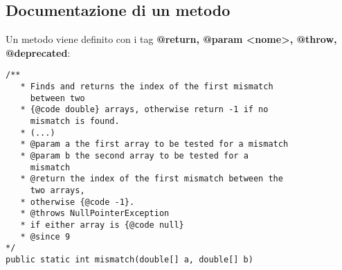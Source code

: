 \documentclass{article}
\begin{document}
\subsection{Documentazione di un metodo}
Un metodo viene definito con i tag \textbf{@return, @param <nome>, @throw, @deprecated}:
\\
\begin{verbatim}
/**
   * Finds and returns the index of the first mismatch
     between two
   * {@code double} arrays, otherwise return -1 if no
     mismatch is found.
   * (...)
   * @param a the first array to be tested for a mismatch
   * @param b the second array to be tested for a
     mismatch
   * @return the index of the first mismatch between the
     two arrays,
   * otherwise {@code -1}.
   * @throws NullPointerException
   * if either array is {@code null}
   * @since 9
*/
public static int mismatch(double[] a, double[] b)
\end{verbatim}
\end{document}

